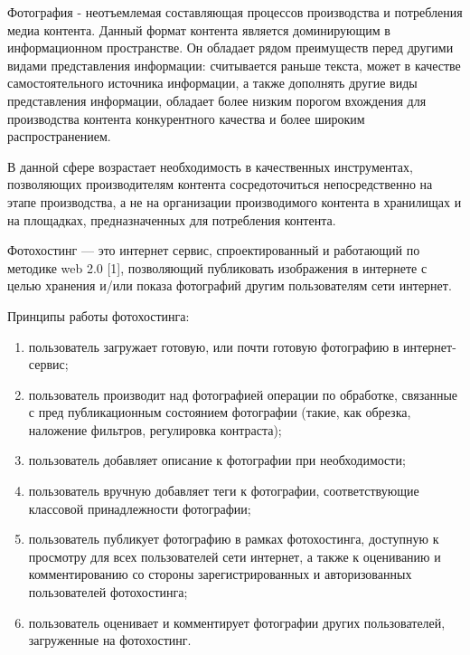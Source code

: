 
Фотография - неотъемлемая составляющая процессов производства и потребления медиа контента.
Данный формат контента является доминирующим в информационном пространстве. Он обладает рядом преимуществ перед другими видами представления информации: считывается раньше текста, может в качестве самостоятельного источника информации, а также дополнять другие виды представления информации, обладает более низким порогом вхождения для производства контента конкурентного качества и более широким распространением.

В данной сфере возрастает необходимость в качественных инструментах, позволяющих производителям контента сосредоточиться непосредственно на этапе производства, а не на организации производимого контента в хранилищах и на площадках, предназначенных для потребления контента.

Фотохостинг — это интернет сервис, спроектированный и работающий по методике web 2.0 [1], позволяющий публиковать изображения в интернете с целью хранения и/или показа фотографий другим пользователям сети интернет.

Принципы работы фотохостинга:
\begin{enumerate}
    \item пользователь загружает готовую, или почти готовую фотографию в интернет-сервис;
    \item пользователь производит над фотографией операции по обработке, связанные с пред публикационным состоянием фотографии (такие, как обрезка, наложение фильтров, регулировка контраста);
    \item пользователь добавляет описание к фотографии при необходимости;
    \item пользователь вручную добавляет теги к фотографии, соответствующие классовой принадлежности фотографии;
    \item пользователь публикует фотографию в рамках фотохостинга, доступную к просмотру для всех пользователей сети интернет, а также к оцениванию и комментированию со стороны зарегистрированных и авторизованных пользователей фотохостинга;
    \item пользователь оценивает и комментирует фотографии других пользователей, загруженные на фотохостинг.
\end{enumerate}
    
